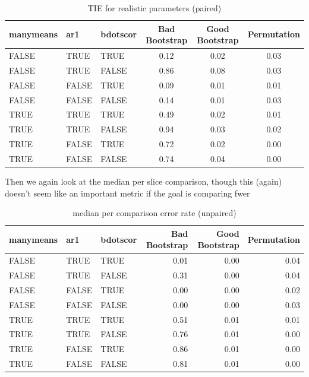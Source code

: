\documentclass{article}
\begin{document}
\begin{table}[H]
\centering
\begin{tabular}{lllccc}
  \hline
  manymeans & ar1 & bdotscor &  Bad Bootstrap & Good Bootstrap & Permutation \\ 
  \hline
FALSE & TRUE & TRUE & 0.12 & 0.02 & 0.03 \\ 
  FALSE & TRUE & FALSE & 0.86 & 0.08 & 0.03 \\ 
  FALSE & FALSE & TRUE & 0.09 & 0.01 & 0.01 \\ 
  FALSE & FALSE & FALSE & 0.14 & 0.01 & 0.03 \\ 
  TRUE & TRUE & TRUE & 0.49 & 0.02 & 0.01 \\ 
  TRUE & TRUE & FALSE & 0.94 & 0.03 & 0.02 \\ 
  TRUE & FALSE & TRUE & 0.72 & 0.02 & 0.00 \\ 
  TRUE & FALSE & FALSE & 0.74 & 0.04 & 0.00 \\ 
   \hline
\end{tabular}
\caption{TIE for realistic parameters (paired)}
\end{table}

Then we again look at the median per slice comparison, though this (again) doesn't seem like an important metric if the goal is comparing fwer

\begin{table}[H]
\centering
\begin{tabular}{lllrrr}
  \hline
  manymeans & ar1 & bdotscor &  Bad Bootstrap & Good Bootstrap & Permutation  \\ 
  \hline
FALSE & TRUE & TRUE & 0.01 & 0.00 & 0.04 \\ 
  FALSE & TRUE & FALSE & 0.31 & 0.00 & 0.04 \\ 
  FALSE & FALSE & TRUE & 0.00 & 0.00 & 0.02 \\ 
  FALSE & FALSE & FALSE & 0.00 & 0.00 & 0.03 \\ 
  TRUE & TRUE & TRUE & 0.51 & 0.01 & 0.01 \\ 
  TRUE & TRUE & FALSE & 0.76 & 0.01 & 0.00 \\ 
  TRUE & FALSE & TRUE & 0.86 & 0.01 & 0.00 \\ 
  TRUE & FALSE & FALSE & 0.81 & 0.01 & 0.00 \\ 
   \hline
\end{tabular}
\caption{median per comparison error rate (unpaired)}
\end{table}
\end{document}

